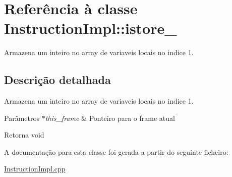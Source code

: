 \hypertarget{class_instruction_impl_1_1istore__1}{}\section{Referência à classe Instruction\+Impl\+:\+:istore\+\_}
\label{class_instruction_impl_1_1istore__1}


Armazena um inteiro no array de variaveis locais no indice 1.  




\subsection{Descrição detalhada}
Armazena um inteiro no array de variaveis locais no indice 1. 


\begin{DoxyParams}{Parâmetros}
{\em $\ast$this\+\_\+frame} & Ponteiro para o frame atual \\
\hline
\end{DoxyParams}
\begin{DoxyReturn}{Retorna}
void 
\end{DoxyReturn}


A documentação para esta classe foi gerada a partir do seguinte ficheiro\+:\begin{DoxyCompactItemize}
\item 
\hyperlink{_instruction_impl_8cpp}{Instruction\+Impl.\+cpp}\end{DoxyCompactItemize}
